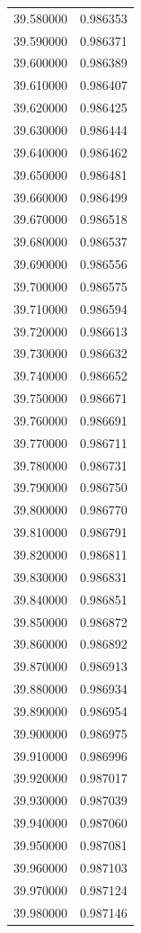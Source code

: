 \begin{tabular}{rr}
39.580000 & 0.986353 \\
39.590000 & 0.986371 \\
39.600000 & 0.986389 \\
39.610000 & 0.986407 \\
39.620000 & 0.986425 \\
39.630000 & 0.986444 \\
39.640000 & 0.986462 \\
39.650000 & 0.986481 \\
39.660000 & 0.986499 \\
39.670000 & 0.986518 \\
39.680000 & 0.986537 \\
39.690000 & 0.986556 \\
39.700000 & 0.986575 \\
39.710000 & 0.986594 \\
39.720000 & 0.986613 \\
39.730000 & 0.986632 \\
39.740000 & 0.986652 \\
39.750000 & 0.986671 \\
39.760000 & 0.986691 \\
39.770000 & 0.986711 \\
39.780000 & 0.986731 \\
39.790000 & 0.986750 \\
39.800000 & 0.986770 \\
39.810000 & 0.986791 \\
39.820000 & 0.986811 \\
39.830000 & 0.986831 \\
39.840000 & 0.986851 \\
39.850000 & 0.986872 \\
39.860000 & 0.986892 \\
39.870000 & 0.986913 \\
39.880000 & 0.986934 \\
39.890000 & 0.986954 \\
39.900000 & 0.986975 \\
39.910000 & 0.986996 \\
39.920000 & 0.987017 \\
39.930000 & 0.987039 \\
39.940000 & 0.987060 \\
39.950000 & 0.987081 \\
39.960000 & 0.987103 \\
39.970000 & 0.987124 \\
39.980000 & 0.987146 \\

\end{tabular}
